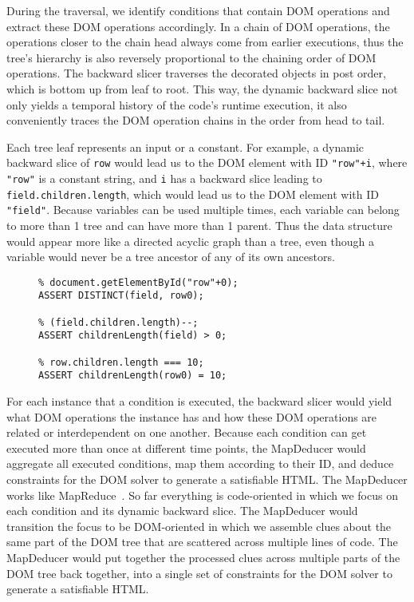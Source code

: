 During the traversal, we identify conditions that contain DOM operations and extract these DOM operations accordingly.  
In a chain of DOM operations, the operations closer to the chain head always come from earlier executions, thus the tree's hierarchy is also reversely proportional to the chaining order of DOM operations.  
The backward slicer traverses the decorated objects in post order, which is bottom up from leaf to root.  
This way, the dynamic backward slice not only yields a temporal history of the code's runtime execution, it also conveniently traces the DOM operation chains in the order from head to tail.

Each tree leaf represents an input or a constant.  
For example, a dynamic backward slice of {\tt row} would lead us to the DOM element with ID {\tt "row"+i}, where {\tt "row"} is a constant string, 
and {\tt i} has a backward slice leading to {\tt field.children.length}, which would lead us to the DOM element with ID {\tt "field"}.  
Because variables can be used multiple times, each variable can belong to more than 1 tree and can have more than 1 parent.  
Thus the data structure would appear more like a directed acyclic graph than a tree, even though a variable would never be a tree ancestor of any of its own ancestors.  

\begin{figure}
\begin{lstlisting}[caption=DOM constraints for generating an HTML that would satisfy for going the {\tt True} branch in the {\tt if} statement of Sample Code ~\ref{dom0}.  The constraints are shown in the input format for the CVC~\cite{cvc3} implementation of the SMT solver. {\tt \%} is the comment operator in CVC.,label=constraints0]
% document.getElementById("field");
% document.getElementById("row"+0);
ASSERT DISTINCT(field, row0);

% (field.children.length)--;
ASSERT childrenLength(field) > 0;

% row.children.length === 10;
ASSERT childrenLength(row0) = 10;
\end{lstlisting}
\end{figure}

For each instance that a condition is executed, the backward slicer would yield what DOM operations the instance has and how these DOM operations are related or interdependent on one another.  
Because each condition can get executed more than once at different time points, the MapDeducer would aggregate all executed conditions, map them according to their ID, and deduce constraints for the DOM solver to generate a satisfiable HTML.  
The MapDeducer works like MapReduce~\cite{mapreduce}.  So far everything is code-oriented in which we focus on each condition and its dynamic backward slice.  The MapDeducer would transition the focus to be DOM-oriented in which we assemble clues about the same part of the DOM tree that are scattered across multiple lines of code.  
The MapDeducer would put together the processed clues across multiple parts of the DOM tree back together, into a single set of constraints for the DOM solver to generate a satisfiable HTML.

